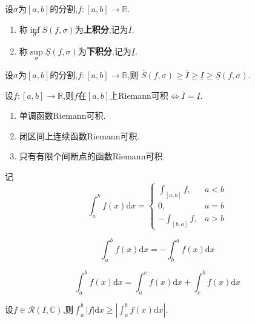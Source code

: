 \begin{deff}
    设$\sigma$为$[a,b]$的分割,$f:[a,b]\to\mathbb{R}$.
    \begin{enumerate}
        \item 称$\inf\limits_{\sigma}\overline{S}(f,\sigma)$为\textbf{上积分},记为$\overline{I}$.
        \item 称$\sup\limits_{\sigma}\underline{S}(f,\sigma)$为\textbf{下积分},记为$\underline{I}$.
    \end{enumerate}
\end{deff}

\begin{prop}
    设$\sigma$为$[a,b]$的分割,$f:[a,b]\to\mathbb{R}$,则
    $\overline{S}(f,\sigma)\geqslant\overline{I}\geqslant\underline{I}\geqslant\underline{S}(f,\sigma)$.
\end{prop}

\begin{thm}
    设$f:[a,b]\to\mathbb{R}$,则$f$在$[a,b]$上Riemann可积$\iff\overline{I}=\underline{I}$.
\end{thm}

\begin{prop}
    \begin{enumerate}
        \item 单调函数Riemann可积.
        \item 闭区间上连续函数Riemann可积.
        \item 只有有限个间断点的函数Riemann可积.
    \end{enumerate}
\end{prop}

\begin{deff}
    记\[ \int_a^b f(x)\mathrm{d}x=\begin{cases} \int_{[a,b]}f, & a<b \\ 0, & a=b \\ -\int_{[b,a]}f, & a>b \end{cases} \]
\end{deff}

\begin{prop}
    \[ \int_a^b f(x)\mathrm{d}x=-\int_b^a f(x)\mathrm{d}x \]
\end{prop}

\begin{prop}
    \[ \int_a^b f(x)\mathrm{d}x=\int_a^c f(x)\mathrm{d}x+\int_c^b f(x)\mathrm{d}x \]
\end{prop}

\begin{prop}
    设$f\in\mathcal{R}(I,\mathbb{C})$,则$\int_a^b \left\lvert f \right\rvert \mathrm{d}x \geqslant \left\lvert \int_a^b f(x)\mathrm{d}x \right\rvert$.
\end{prop}

